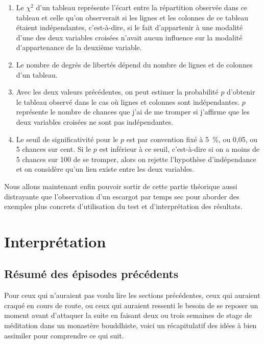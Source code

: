 \documentclass[a4paper,10pt,twoside,francais]{report}
\newcommand{\chid}{$\chi^2$\xspace}
\begin{document}
\begin{enumerate}
\item Le \chid d'un tableau représente l'écart entre la répartition
  observée dans ce tableau et celle qu'on observerait si les lignes et
  les colonnes de ce tableau étaient indépendantes, c'est-à-dire, si
  le fait d'appartenir à une modalité d'une des deux variables
  croisées n'avait aucun influence sur la modalité d'appartenance de
  la deuxième variable.
\item Le nombre de degrés de libertés dépend du nombre de lignes et de
  colonnes d'un tableau.
\item Avec les deux valeurs précédentes, on peut estimer la
  probabilité $p$ d'obtenir le tableau observé dans le cas où lignes
  et colonnes sont indépendantes. $p$ représente le nombre de chances
  que j'ai de me tromper si j'affirme que les deux variables croisées
  ne sont pas indépendantes.
\item Le seuil de significativité pour le $p$ est par convention fixé
  à 5~\%, ou 0,05, ou 5 chances sur cent. Si le $p$ est inférieur à ce
  seuil, c'est-à-dire si on a moins de 5 chances sur 100 de se
  tromper, alors on rejette l'hypothèse d'indépendance et on considère
  qu'un lien existe entre les deux variables.
\end{enumerate}

Nous allons maintenant enfin pouvoir sortir de cette partie théorique
aussi distrayante que l'observation d'un escargot par temps sec pour
aborder des exemples plus concrets d'utilisation du test et
d'interprétation des résultats.



\chapter{Interprétation}
\label{sec-interp}


\section{Résumé des épisodes précédents}

Pour ceux qui n'auraient pas voulu lire les sections précédentes, ceux
qui auraient craqué en cours de route, ou ceux qui auraient ressenti
le besoin de se reposer un moment avant d'attaquer la suite en faisant
deux ou trois semaines de stage de méditation dans un monastère
bouddhiste, voici un récapitulatif des idées à bien assimiler pour
comprendre ce qui suit.
\end{document}
